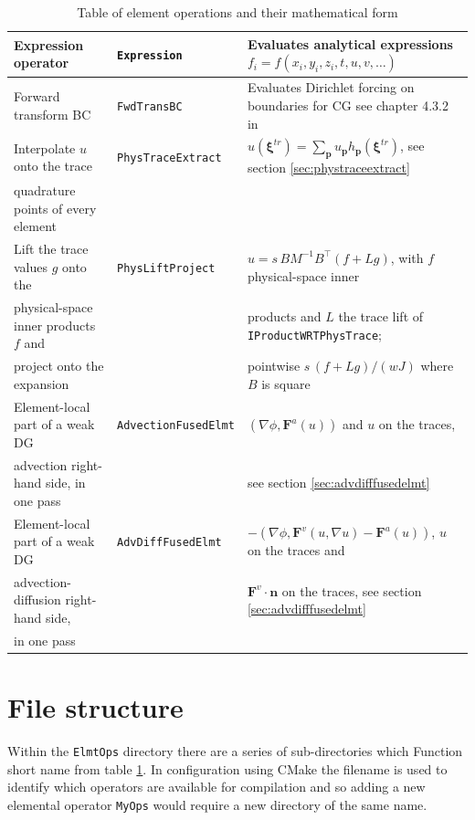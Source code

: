 \begin {table}[htbp!]
\begin{center}
{\begin{tabular}{ |l | l| l|}
      \hline
Expression operator & \texttt{Expression} & Evaluates analytical expressions $f_{i} = f(x_i,y_i,z_i,t,u,v,\ldots)$  \\
      \hline
Forward transform BC & \texttt{FwdTransBC} & Evaluates Dirichlet forcing on boundaries for CG see chapter 4.3.2 in \cite{KaSh05} \\
      \hline
Interpolate $u$ onto the trace & \texttt{PhysTraceExtract} & $u(\boldsymbol\xi^{tr}) = \sum_{\boldsymbol p} u_{\boldsymbol p} h_{\boldsymbol p}(\boldsymbol\xi^{tr})$, see section \ref{sec:phystraceextract} \\
quadrature points of every element & & \\
      \hline
Lift the trace values $g$ onto the & \texttt{PhysLiftProject} & $u = s\, B M^{-1} B^{\top} (f + L g)$, with $f$ physical-space inner \\
physical-space inner products $f$ and & & products and $L$ the trace lift of \texttt{IProductWRTPhysTrace}; \\
project onto the expansion & & pointwise $s\,(f + L g)/(wJ)$ where $B$ is square \\
      \hline
Element-local part of a weak DG & \texttt{AdvectionFusedElmt} & $(\nabla \phi, \mathbf F^a(u))$ and $u$ on the traces, \\
advection right-hand side, in one pass & & see section \ref{sec:advdifffusedelmt} \\
      \hline
Element-local part of a weak DG & \texttt{AdvDiffFusedElmt} & $-(\nabla \phi, \mathbf F^v(u, \nabla u) - \mathbf F^a(u))$, $u$ on the traces and \\
advection-diffusion right-hand side, & & $\mathbf F^v \cdot \mathbf n$ on the traces, see section \ref{sec:advdifffusedelmt} \\
in one pass & & \\
      \hline
    \end{tabular}
    }
    \end{center}
    \caption {Table of element operations and their mathematical form} \label{tab:elmtops} 
    \end{table}



\section{File structure}

Within the \texttt{ElmtOps} directory there are a series of
sub-directories which Function short name from table
\ref{tab:elmtops}. In configuration using CMake the filename is used
to identify which operators are available for compilation and so
adding a new elemental operator \texttt{MyOps} would require a new
directory of the same name.

